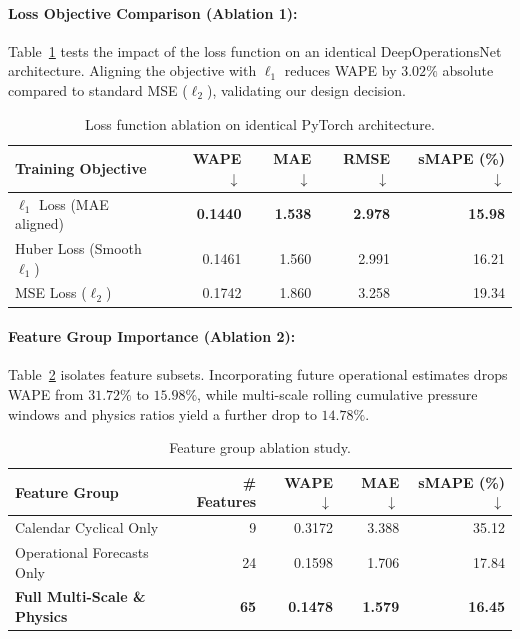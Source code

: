 \documentclass[11pt,a4paper]{article}
\begin{document}
\paragraph{Loss Objective Comparison (Ablation 1):}
Table~\ref{tab:loss_ablation} tests the impact of the loss function on an identical DeepOperationsNet architecture. Aligning the objective with $\ell_1$ reduces WAPE by $3.02\%$ absolute compared to standard MSE ($\ell_2$), validating our design decision.

\begin{table}[htbp]
\centering
\caption{Loss function ablation on identical PyTorch architecture.}
\label{tab:loss_ablation}
\vspace{2mm}
\begin{tabular}{lrrrr}
\toprule
\textbf{Training Objective} & \textbf{WAPE} $\downarrow$ & \textbf{MAE} $\downarrow$ & \textbf{RMSE} $\downarrow$ & \textbf{sMAPE (\%)} $\downarrow$ \\
\midrule
$\ell_1$ Loss (MAE aligned) & \textbf{0.1440} & \textbf{1.538} & \textbf{2.978} & \textbf{15.98} \\
Huber Loss (Smooth $\ell_1$) & 0.1461 & 1.560 & 2.991 & 16.21 \\
MSE Loss ($\ell_2$) & 0.1742 & 1.860 & 3.258 & 19.34 \\
\bottomrule
\end{tabular}
\end{table}

\paragraph{Feature Group Importance (Ablation 2):}
Table~\ref{tab:feature_ablation} isolates feature subsets. Incorporating future operational estimates drops WAPE from $31.72\%$ to $15.98\%$, while multi-scale rolling cumulative pressure windows and physics ratios yield a further drop to $14.78\%$.

\begin{table}[htbp]
\centering
\caption{Feature group ablation study.}
\label{tab:feature_ablation}
\vspace{2mm}
\begin{tabular}{lrrrr}
\toprule
\textbf{Feature Group} & \textbf{\# Features} & \textbf{WAPE} $\downarrow$ & \textbf{MAE} $\downarrow$ & \textbf{sMAPE (\%)} $\downarrow$ \\
\midrule
Calendar Cyclical Only & 9 & 0.3172 & 3.388 & 35.12 \\
Operational Forecasts Only & 24 & 0.1598 & 1.706 & 17.84 \\
\textbf{Full Multi-Scale \& Physics} & \textbf{65} & \textbf{0.1478} & \textbf{1.579} & \textbf{16.45} \\
\bottomrule
\end{tabular}
\end{table}
\end{document}
